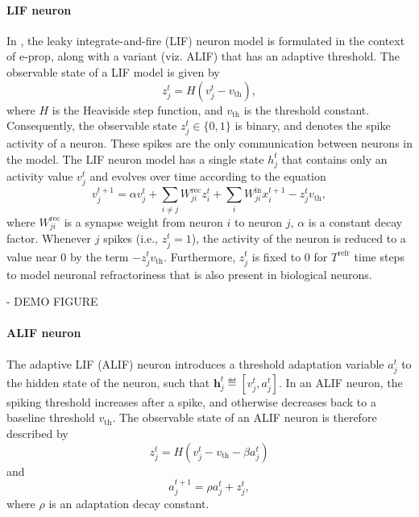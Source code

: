         \paragraph{LIF neuron}
        In \cite{bellec2020solution}, the leaky integrate-and-fire (LIF) neuron model is formulated in the context of e-prop, along with a variant (viz. ALIF) that has an adaptive threshold. 
        The observable state of a LIF model is given by
        \begin{equation}
        z^t_j = H\left(v_j^t-v_\text{th}\right),
        \end{equation}
        where $H$ is the Heaviside step function, and $v_\text{th}$ is the threshold constant.
        Consequently, the observable state $z^t_j \in \{0, 1\}$ is binary, and denotes the spike activity of a neuron.
        These spikes are the only communication between neurons in the model.
        The LIF neuron model has a single state $h^t_j$ that contains only an activity value $v^t_j$ and evolves over time according to the equation
        \begin{equation}
        v^{t+1}_j = \alpha v_j^t + \sum_{i\neq j}W^\text{rec}_{ji}z_i^t + \sum_i W^\text{in}_{ji}x_i^{t+1} - z_j^tv_
        \text{th},
        \end{equation}
        where $W^\text{rec}_{ji}$ is a synapse weight from neuron $i$ to neuron $j$, $\alpha$ is a constant decay factor.
        Whenever $j$ spikes (i.e., $z_j^t = 1$), the activity of the neuron is reduced to a value near 0 by the term $-z^t_jv_\text{th}$.
        Furthermore, $z^t_j$ is fixed to 0 for $T^\text{refr}$ time steps to model neuronal refractoriness that is also present in biological neurons.
        \begin{tcolorbox}[colback=orange]
        - DEMO FIGURE
        \vspace{10cm}

        \end{tcolorbox}

        \paragraph{ALIF neuron}
        The adaptive LIF (ALIF) neuron introduces a threshold adaptation variable $a^t_j$ to the hidden state of the neuron, such that $\mathbf{h}^t_j \eqdef \left[v^t_j, a^t_j\right]$.
        In an ALIF neuron, the spiking threshold increases after a spike, and otherwise decreases back to a baseline threshold $v_\text{th}$.
        The observable state of an ALIF neuron is therefore described by
        \begin{equation}
        z^t_j = H\left(v_j^t - v_\text{th} - \beta a^t_j\right)
        \end{equation}
        and
        \begin{equation}
        a^{t+1}_j = \rho a^t_j + z^t_j,
        \end{equation}
        where $\rho$ is an adaptation decay constant.

